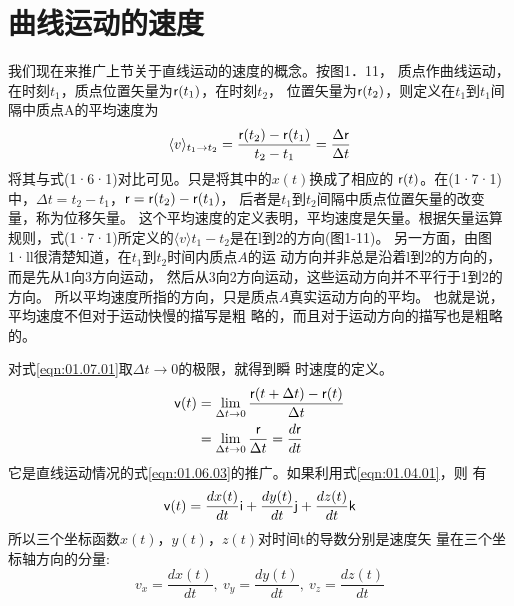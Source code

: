 \section{曲线运动的速度}\label{sec:01.07}

我们现在来推广上节关于直线运动的速度的概念。按图1．11，
质点作曲线运动，在时刻$t_1$，质点位置矢量为${\sf r}(t_1)$，在时刻$t_2$，
位置矢量为${\sf r}(t_2)$，则定义在$t_1$到$t_1$间隔中质点A的平均速度为
\begin{equation}\label{eqn:01.07.01}
    \langle v \rangle_{t_1\rightarrow t_2}=\frac{{\sf r}(t_2)-{\sf r}(t_1)}{t_2-t_1}=\frac{\Delta {\sf r}}{\Delta t}
\end{equation}
将其与式(1·6·1)对比可见。只是将其中的$x(t)$换成了相应的
${\sf r}(t)$。在(1·7·1)中，$\Delta t=t_2-t_1$，${\sf r}={\sf r}(t_2)-{\sf r}(t_1)$，
后者是$t_1$到$t_2$间隔中质点位置矢量的改变量，称为位移矢量。
这个平均速度的定义表明，平均速度是矢量。根据矢量运算
规则，式(1·7·1)所定义的$\langle v\rangle t_1-t_2$是在l到2的方向(图1-11)。
另一方面，由图1·ll很清楚知道，在$t_1$到$t_2$时间内质点$A$的运
动方向并非总是沿着l到2的方向的，而是先从1向3方向运动，
然后从3向2方向运动，这些运动方向并不平行于1到2的方向。
所以平均速度所指的方向，只是质点$A$真实运动方向的平均。
也就是说，平均速度不但对于运动快慢的描写是粗
略的，而且对于运动方向的描写也是粗略的。

对式\eqref{eqn:01.07.01}取$\Delta t \rightarrow 0$的极限，就得到瞬
时速度的定义。
\begin{equation}\label{eqn:01.07.02}
    \begin{aligned}
        {\sf v}(t) & =\lim _{\Delta t \rightarrow 0} \frac{{\sf r}(t+\Delta t)-{\sf r}(t)}{\Delta t} \\
                  & =\lim _{\Delta t \rightarrow 0} \frac{{\sf r}}{\Delta t} =\frac{d{\sf r}}{dt}
    \end{aligned}
\end{equation}
它是直线运动情况的式\eqref{eqn:01.06.03}的推广。如果利用式\eqref{eqn:01.04.01}，则
有
\begin{equation}\label{eqn:01.07.03}
    {\sf v}(t)=\frac{d x(t)}{d t} {\sf i}+\frac{d y(t)}{d t} {\sf j}+\frac{d z(t)}{d t} {\sf k}
\end{equation}
所以三个坐标函数$x(t)$，$y(t)$，$z(t)$对时间t的导数分别是速度矢
量在三个坐标轴方向的分量:
\begin{equation}\label{eqn:01.07.04}
    v_{x}=\frac{d x(t)}{d t}, ~ v_{y}=\frac{d y(t)}{d t}, ~ v_{z}=\frac{d z(t)}{d t}
\end{equation}

